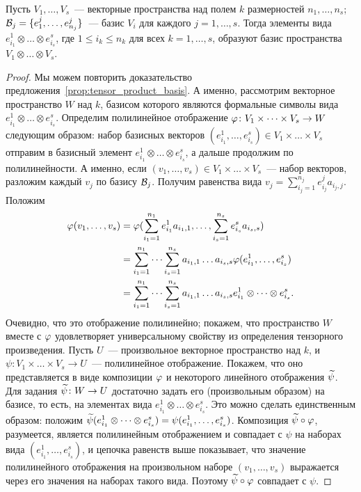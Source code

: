 \begin{proposition}
Пусть $V_1,\dots,V_s$~--- векторные пространства над полем $k$
размерностей $n_1,\dots,n_s$;
$\mathcal B_j=\{e^j_1,\dots,e^j_{n_j}\}$~--- базис $V_i$ для каждого
$j=1,\dots,s$.
Тогда элементы вида $e^1_{i_1}\otimes\dots\otimes e^s_{i_s}$, где
$1\leq i_k\leq n_k$ для всех $k=1,\dots,s$, образуют базис
пространства $V_1\otimes\dots\otimes V_s$.
\end{proposition}
\begin{proof}
Мы можем повторить доказательство
предложения~\ref{prop:tensor_product_basis}. А именно, рассмотрим
векторное пространство $W$ над $k$, базисом которого являются формальные
символы вида $e^1_{i_1}\otimes\dots\otimes e^s_{i_s}$. Определим
полилинейное отображение $\varphi\colon V_1\times\dots\times V_s\to W$
следующим образом: набор базисных векторов
$(e^1_{i_1},\dots,e^s_{i_s})\in V_1\times\dots\times V_s$
отправим в базисный элемент $e^1_{i_1}\otimes\dots\otimes e^s_{i_s}$,
а дальше продолжим по полилинейности.
А именно,
если $(v_1,\dots,v_s)\in V_1\times\dots\times V_s$~--- набор
векторов, разложим каждый $v_j$ по базису $\mathcal B_j$. Получим равенства
вида $v_j = \sum_{i_j=1}^{n_j} e^j_{i_j} a_{i_j,j}$.
Положим
\begin{align*}
\varphi(v_1,\dots,v_s) &= \varphi(\sum_{i_1=1}^{n_1} e^1_{i_1}a_{i_1,1},
\dots,\sum_{i_s=1}^{n_s} e^s_{i_s}a_{i_s,s}) \\
&= \sum_{i_1=1}^{n_1}\dots\sum_{i_s=1}^{n_s}a_{i_1,1}\dots
a_{i_s,s}\varphi(e^1_{i_1},\dots,e^s_{i_s}) \\
& = \sum_{i_1=1}^{n_1}\dots\sum_{i_s=1}^{n_s}a_{i_1,1}\dots
a_{i_s,s} e^1_{i_1}\otimes\dots\otimes e^s_{i_s}.
\end{align*}
Очевидно, что это отображение полилинейно; покажем, что пространство
$W$ вместе с $\varphi$ удовлетворяет универсальному свойству из
определения тензорного произведения. Пусть $U$~--- произвольное
векторное пространство над $k$, и
$\psi\colon V_1\times\dots\times V_s\to U$~--- полилинейное
отображение. Покажем, что оно представляется в виде композиции $\varphi$ и
некоторого линейного отображения $\widetilde\psi$.
Для задания $\widetilde\psi\colon W\to U$ достаточно задать его
(произвольным образом) на базисе, то есть, на элементах вида
$e^1_{i_1}\otimes\dots\otimes e^s_{i_s}$. Это можно сделать
единственным образом:
положим $\widetilde\psi(e^1_{i_1}\otimes\dots\otimes e^s_{i_s})
= \psi(e^1_{i_1},\dots, e^s_{i_s})$. Композиция $\widetilde\psi\circ\varphi$,
разумеется, является полилинейным отображением и
совпадает с $\psi$ на наборах вида $(e^1_{i_1},\dots,e^s_{i_s})$, и
цепочка равенств выше показывает, что значение полилинейного
отображения на произвольном наборе $(v_1,\dots,v_s)$ выражается через
его значения на наборах такого вида. Поэтому $\widetilde\psi\circ\varphi$
совпадает с $\psi$. 
\end{proof}

